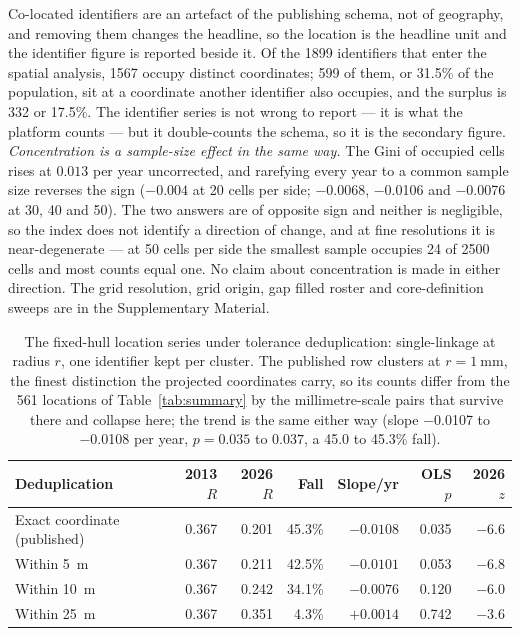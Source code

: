 \documentclass{article}
\newcommand{\giniRareSlope}{-0.004}
\newcommand{\giniRawSlope}{0.013}
\newcommand{\nAnalysed}{1899}
\newcommand{\nLocations}{1567}
\newcommand{\nShared}{599}
\newcommand{\nSurplus}{332}
\newcommand{\sharePct}{31.5}
\newcommand{\surplusPct}{17.5}
\begin{document}
Co-located identifiers are an artefact of the publishing schema, not of geography, and
removing them changes the headline, so the location is the headline unit and the identifier
figure is reported beside it. Of the \nAnalysed{} identifiers that enter the spatial analysis,
\nLocations{} occupy distinct coordinates; \nShared{} of them, or \sharePct\% of the population,
sit at a coordinate another identifier also occupies, and the surplus is \nSurplus{} or
\surplusPct\%. The identifier series is not wrong to report --- it is what the platform counts
--- but it double-counts the schema, so it is the secondary figure. \emph{Concentration is a
sample-size effect in the same way.} The Gini of occupied cells rises at $\giniRawSlope$ per
year uncorrected, and rarefying every year to a common sample size reverses the sign
($\giniRareSlope$ at 20 cells per side; \num{-0.0068}, \num{-0.0106} and \num{-0.0076} at 30,
40 and 50). The two answers are of opposite sign and neither is negligible, so the index does
not identify a direction of change, and at fine resolutions it is near-degenerate --- at 50
cells per side the smallest sample occupies 24 of 2500 cells and most counts equal one. No
claim about concentration is made in either direction. The grid resolution, grid origin, gap
filled roster and core-definition sweeps are in the Supplementary Material.

\begin{table}[htbp]
\centering
\caption{The fixed-hull location series under tolerance deduplication: single-linkage at radius $r$, one identifier kept per cluster. The published row clusters at $r = \SI{1}{\milli\meter}$, the finest distinction the projected coordinates carry, so its counts differ from the \num{561} locations of Table~\ref{tab:summary} by the millimetre-scale pairs that survive there and collapse here; the trend is the same either way (slope \num{-0.0107} to \num{-0.0108} per year, $p = 0.035$ to $0.037$, a \num{45.0} to \num{45.3}\% fall).}
\label{tab:neardup}
\footnotesize
\setlength{\tabcolsep}{5pt}
\begin{tabular}{lrrrrrr}
\toprule
Deduplication & 2013 $R$ & 2026 $R$ & Fall & Slope/yr & OLS $p$ & 2026 $z$ \\
\midrule
Exact coordinate (published) & 0.367 & 0.201 & 45.3\% & $-0.0108$ & 0.035 & $-6.6$ \\
Within \SI{5}{\meter}         & 0.367 & 0.211 & 42.5\% & $-0.0101$ & 0.053 & $-6.8$ \\
Within \SI{10}{\meter}        & 0.367 & 0.242 & 34.1\% & $-0.0076$ & 0.120 & $-6.0$ \\
Within \SI{25}{\meter}        & 0.367 & 0.351 & 4.3\%  & $+0.0014$ & 0.742 & $-3.6$ \\
\bottomrule
\end{tabular}
\end{table}
\end{document}
